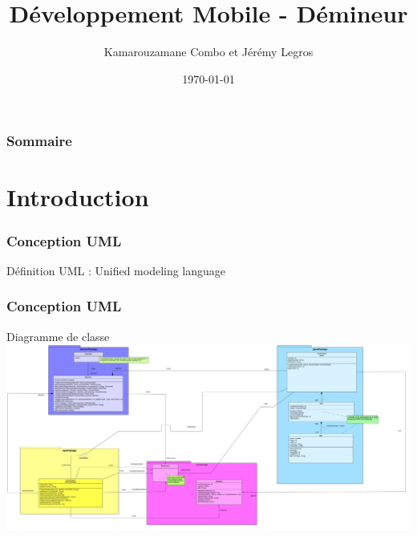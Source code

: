 \documentclass{beamer}
\title[Démineur]{Développement Mobile - Démineur} %
\author{Kamarouzamane Combo et Jérémy Legros} %
\date{\today} %
\begin{document}
\begin{frame}
\titlepage %
\end{frame}

\begin{frame}
\frametitle{Sommaire} %
\tableofcontents %
\end{frame}


\section{Introduction}



\begin{frame}
	\frametitle{Conception UML}
	\begin{block}{Définition}
 		UML : Unified modeling language
	\end{block}
\end{frame}


\begin{frame}
	\frametitle{Conception UML}
	\begin{block}{Diagramme de classe}
 		\includegraphics[scale=0.10]{Images/ClassDiagram.jpg}
	\end{block}
\end{frame}
\end{document}
